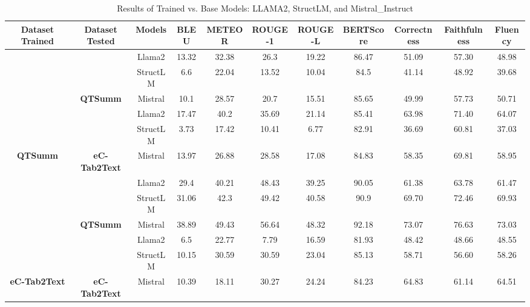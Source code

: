 \begin{table}[t]
    \centering
    \renewcommand{\arraystretch}{1.1} %
    \resizebox{\textwidth}{!} 
    { 
    \begin{tabular}{ccccccccccc}
    \hline
    \rowcolor[HTML]{EFEFEF} 
    \textbf{Dataset Trained} &
      \textbf{Dataset Tested} &
      \textbf{Models} &
      \textbf{BLEU} &
      \textbf{METEOR} &
      \textbf{ROUGE-1} &
      \textbf{ROUGE-L} &
      \textbf{BERTScore} &
      \textbf{Correctness} &
      \textbf{Faithfulness} &
      \textbf{Fluency} \\ \hline \hline
                                           &                                        & Llama2   & 13.32 & 32.38 & 26.3  & 19.22 & 86.47 & 51.09 & 57.30 & 48.98 \\
                                           &                                        & StructLM & 6.6   & 22.04 & 13.52 & 10.04 & 84.5  & 41.14 & 48.92 & 39.68 \\
                                           & \multirow{-3}{*}{\textbf{QTSumm}}      & Mistral  & 10.1  & 28.57 & 20.7  & 15.51 & 85.65 & 49.99 & 57.73 & 50.71 \\ \cline{2-11} 
                                           &                                        & Llama2   & 17.47 & 40.2  & 35.69 & 21.14 & 85.41 & 63.98 & 71.40 & 64.07 \\
                                           &                                        & StructLM & 3.73  & 17.42 & 10.41 & 6.77  & 82.91 & 36.69 & 60.81 & 37.03 \\
    \multirow{-6}{*}{\textbf{QTSumm}}      & \multirow{-3}{*}{\textbf{eC-Tab2Text}} & Mistral  & 13.97 & 26.88 & 28.58 & 17.08 & 84.83 & 58.35 & 69.81 & 58.95 \\ \hline \hline
                                           &                                        & Llama2   & 29.4  & 40.21 & 48.43 & 39.25 & 90.05 & 61.38 & 63.78 & 61.47 \\
                                           &                                        & StructLM & 31.06 & 42.3  & 49.42 & 40.58 & 90.9  & 69.70 & 72.46 & 69.93 \\
                                           & \multirow{-3}{*}{\textbf{QTSumm}}      & Mistral  & 38.89 & 49.43 & 56.64 & 48.32 & 92.18 & 73.07 & 76.63 & 73.03 \\ \cline{2-11} 
                                           &                                        & Llama2   & 6.5   & 22.77 & 7.79  & 16.59 & 81.93 & 48.42 & 48.66 & 48.55 \\
                                           &                                        & StructLM & 10.15 & 30.59 & 30.59 & 23.04 & 85.13 & 58.71 & 56.60 & 58.26 \\
    \multirow{-6}{*}{\textbf{eC-Tab2Text}} & \multirow{-3}{*}{\textbf{eC-Tab2Text}} & Mistral  & 10.39 & 18.11 & 30.27 & 24.24 & 84.23 & 64.83 & 61.14 & 64.51 \\ \hline
    \end{tabular}
    }
    \caption{Results of Trained vs. Base Models: LLAMA2, StructLM, and Mistral\_Instruct}
    \label{table:results}
    \end{table}

